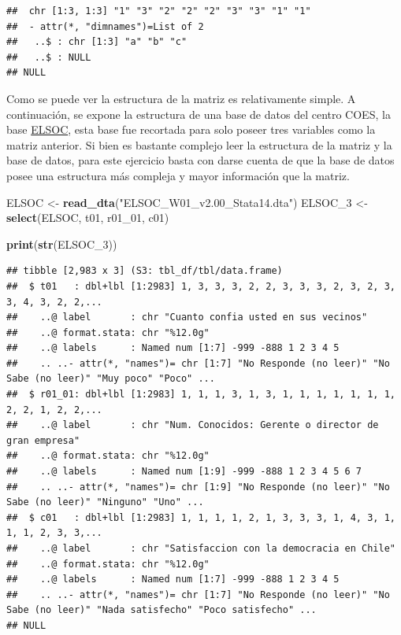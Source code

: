 \documentclass[
  14pt,
]{book}
\newenvironment{Shaded}{\begin{snugshade}}{\end{snugshade}}
\newcommand{\DecValTok}[1]{\textcolor[rgb]{0.00,0.00,0.81}{#1}}
\newcommand{\KeywordTok}[1]{\textcolor[rgb]{0.13,0.29,0.53}{\textbf{#1}}}
\newcommand{\NormalTok}[1]{#1}
\newcommand{\StringTok}[1]{\textcolor[rgb]{0.31,0.60,0.02}{#1}}
\begin{document}
\begin{verbatim}
##  chr [1:3, 1:3] "1" "3" "2" "2" "2" "3" "3" "1" "1"
##  - attr(*, "dimnames")=List of 2
##   ..$ : chr [1:3] "a" "b" "c"
##   ..$ : NULL
## NULL
\end{verbatim}

Como se puede ver la estructura de la matriz es relativamente simple. A continuación, se expone la estructura de una base de datos del centro COES, la base \href{}{ELSOC}, esta base fue recortada para solo poseer tres variables como la matriz anterior. Si bien es bastante complejo leer la estructura de la matriz y la base de datos, para este ejercicio basta con darse cuenta de que la base de datos posee una estructura más compleja y mayor información que la matriz.

\begin{Shaded}
\begin{Highlighting}[]
\NormalTok{ELSOC <-}\StringTok{ }\KeywordTok{read_dta}\NormalTok{(}\StringTok{"ELSOC_W01_v2.00_Stata14.dta"}\NormalTok{)}
\NormalTok{ELSOC_}\DecValTok{3}\NormalTok{ <-}\StringTok{ }\KeywordTok{select}\NormalTok{(ELSOC, t01, r01_}\DecValTok{01}\NormalTok{, c01)}

\KeywordTok{print}\NormalTok{(}\KeywordTok{str}\NormalTok{(ELSOC_}\DecValTok{3}\NormalTok{))}
\end{Highlighting}
\end{Shaded}

\begin{verbatim}
## tibble [2,983 x 3] (S3: tbl_df/tbl/data.frame)
##  $ t01   : dbl+lbl [1:2983] 1, 3, 3, 3, 2, 2, 3, 3, 3, 2, 3, 2, 3, 3, 4, 3, 2, 2,...
##    ..@ label       : chr "Cuanto confia usted en sus vecinos"
##    ..@ format.stata: chr "%12.0g"
##    ..@ labels      : Named num [1:7] -999 -888 1 2 3 4 5
##    .. ..- attr(*, "names")= chr [1:7] "No Responde (no leer)" "No Sabe (no leer)" "Muy poco" "Poco" ...
##  $ r01_01: dbl+lbl [1:2983] 1, 1, 1, 3, 1, 3, 1, 1, 1, 1, 1, 1, 1, 2, 2, 1, 2, 2,...
##    ..@ label       : chr "Num. Conocidos: Gerente o director de gran empresa"
##    ..@ format.stata: chr "%12.0g"
##    ..@ labels      : Named num [1:9] -999 -888 1 2 3 4 5 6 7
##    .. ..- attr(*, "names")= chr [1:9] "No Responde (no leer)" "No Sabe (no leer)" "Ninguno" "Uno" ...
##  $ c01   : dbl+lbl [1:2983] 1, 1, 1, 1, 2, 1, 3, 3, 3, 1, 4, 3, 1, 1, 1, 2, 3, 3,...
##    ..@ label       : chr "Satisfaccion con la democracia en Chile"
##    ..@ format.stata: chr "%12.0g"
##    ..@ labels      : Named num [1:7] -999 -888 1 2 3 4 5
##    .. ..- attr(*, "names")= chr [1:7] "No Responde (no leer)" "No Sabe (no leer)" "Nada satisfecho" "Poco satisfecho" ...
## NULL
\end{verbatim}
\end{document}
